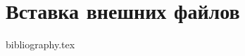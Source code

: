 \documentclass{article}
\begin{document}
\section*{Вставка внешних файлов}


\vspace{10mm}
\begingroup
\obeylines
%
\endgroup%

\vspace{10mm}
\lstset{style=mystyle1}


\clearpage

\begin{thebibliography}{100} 
{bibliography.tex}
\end{thebibliography}
\end{document}
